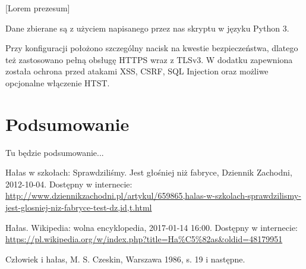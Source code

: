 \documentclass[12pt, a4paper]{article}
\begin{document}
[Lorem prezesum]

Dane zbierane są z użyciem napisanego przez nas skryptu w języku Python 3. 

Przy konfiguracji położono szczególny nacisk na kwestie bezpieczeństwa, dlatego też zastosowano pełną obsługę HTTPS wraz z TLSv3. W dodatku zapewniona została ochrona przed atakami XSS, CSRF, SQL Injection oraz możliwe opcjonalne włączenie HTST.

\section{Podsumowanie}

Tu będzie podsumowanie...

\begin{thebibliography}{9}

  Hałas w szkołach: Sprawdziliśmy. Jest głośniej niż fabryce, Dziennik Zachodni, 2012-10-04. Dostępny w internecie: \url{http://www.dziennikzachodni.pl/artykul/659865,halas-w-szkolach-sprawdzilismy-jest-glosniej-niz-fabryce-test-dz,id,t.html}

  Hałas. Wikipedia: wolna encyklopedia, 2017-01-14 16:00. Dostępny w internecie: \url{https://pl.wikipedia.org/w/index.php?title=Ha%C5%82as&oldid=48179951}
  
  Człowiek i hałas, M. S. Czeskin, Warszawa 1986, s. 19 i następne.
  
\end{thebibliography}
\end{document}
